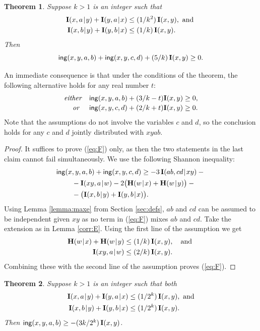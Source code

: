 \documentclass[a4paper]{IEEEtran}
\def\|{\mskip1.5mu{|}\mskip1.5mu}
\def\H{\mathbf H}
\def\I{\mathbf I}
\def\ing[#1,#2,#3,#4]{\mathsf{ing}(#1,#2,#3,#4\mkern 0mu)}
\newtheorem{theorem}{Theorem}
\theoremstyle{definition}
\begin{document}
\begin{theorem}\label{thm:F}
Suppose $k>1$ is an integer such that
\begin{align*}
  \I(x,a\|y)+\I(y,a\|x) &\le (1/k^2)\,\I(x,y), \mbox{ and }\\
  \I(x,b\|y)+\I(y,b\|x) &\le (1/k)\,\I(x,y).
\end{align*}
Then
\begin{equation}\label{eq:F}
   \ing[x,y,a,b]+\ing[x,y,c,d]+ (5/k)\,\I(x,y) \ge 0.
\end{equation}
\end{theorem}

An immediate consequence is that under the conditions of the theorem, the
following alternative holds for any real number $t$:
$$\begin{array}{rl}
   \mbox{\emph{either}} & \ing[x,y,a,b] + (3/k-t)\I(x,y)\ge 0,\\[2pt]
   \mbox{\emph{or} }    & \ing[x,y,c,d] + (2/k+t)\I(x,y)\ge 0.
\end{array}$$
Note that the assumptions do not involve the variables $c$ and $d$, so the
conclusion holds for any $c$ and $d$ jointly distributed with $xyab$.

\begin{proof}
It suffices to prove (\ref{eq:F}) only, as then the two statements
in the last claim cannot fail simultaneously. We use the following Shannon
inequality:
\begin{align*}
  & \ing[x,y,a,b] + \ing[x,y,c,d] \ge -3\,\I(ab,cd\|xy) - {} \\
  & \mkern 40mu {}-\I(xy,a\|w)-2\big(\H(w\|x)+\H(w\|y)\big) - {} \\
  & \mkern 40mu {}-\big(\I(x,b\|y)+\I(y,b\|x)\big).
\end{align*}
Using Lemma \ref{lemma:maxe} from Section \ref{sec:defs}, $ab$ and $cd$ can be
assumed to be independent given $xy$ as no term in (\ref{eq:F}) mixes $ab$
and $cd$. Take the extension as in Lemma \ref{corr:E}. Using the first line
of the assumption we get
\begin{align*}
\H(w\|x)+\H(w\|y)&\le (1/k)\,\I(x,y), ~~\mbox{ and }\\
       \I(xy,a\|w)&\le (2/k)\,\I(x,y).
\end{align*}
Combining these with the second line of the assumption proves (\ref{eq:F}).
\end{proof}

\begin{theorem}\label{thm:C}
Suppose $k>1$ is an integer such that both
\begin{align*}
  \I(x,a\|y)+\I(y,a\|x) &\le (1/2^k)\,\I(x,y), \mbox{ and}\\
  \I(x,b\|y)+\I(y,b\|x) &\le (1/2^k)\,\I(x,y).
\end{align*}
Then $\ing[x,y,a,b]\ge -(3k/2^k)\,\I(x,y)$.
\end{theorem}
\end{document}
